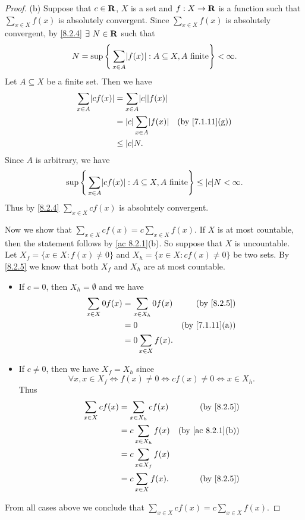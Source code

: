 \begin{proof}{(b)}
  Suppose that \(c \in \mathbf{R}\), \(X\) is a set and \(f : X \to \mathbf{R}\) is a function such that \(\sum_{x \in X} f(x)\) is absolutely convergent.
  Since \(\sum_{x \in X} f(x)\) is absolutely convergent, by \cref{8.2.4} \(\exists\ N \in \mathbf{R}\) such that
  \[
    N = \sup\Bigg\{\sum_{x \in A} \abs{f(x)} : A \subseteq X, A \text{ finite}\Bigg\} < \infty.
  \]
  Let \(A \subseteq X\) be a finite set.
  Then we have
  \begin{align*}
    \sum_{x \in A} \abs{cf(x)} & = \sum_{x \in A} \abs{c}\abs{f(x)}                                \\
                               & = \abs{c}\sum_{x \in A} \abs{f(x)} & \text{(by \cref{7.1.11}(g))} \\
                               & \leq \abs{c} N.
  \end{align*}
  Since \(A\) is arbitrary, we have
  \[
    \sup\Bigg\{\sum_{x \in A} \abs{cf(x)} : A \subseteq X, A \text{ finite}\Bigg\} \leq \abs{c}N < \infty.
  \]
  Thus by \cref{8.2.4} \(\sum_{x \in X} cf(x)\) is absolutely convergent.

  Now we show that \(\sum_{x \in X} cf(x) = c \sum_{x \in X} f(x)\).
  If \(X\) is at most countable, then the statement follows by \cref{ac 8.2.1}(b).
  So suppose that \(X\) is uncountable.
  Let \(X_f = \{x \in X : f(x) \neq 0\}\) and \(X_h = \{x \in X : cf(x) \neq 0\}\) be two sets.
  By \cref{8.2.5} we know that both \(X_f\) and \(X_h\) are at most countable.
  \begin{itemize}
    \item If \(c = 0\), then \(X_h = \emptyset\) and we have
          \begin{align*}
            \sum_{x \in X} 0f(x) & = \sum_{x \in X_h} 0f(x) & \text{(by \cref{8.2.5})}     \\
                                 & = 0                      & \text{(by \cref{7.1.11}(a))} \\
                                 & = 0 \sum_{x \in X} f(x).
          \end{align*}
    \item If \(c \neq 0\), then we have \(X_f = X_h\) since
          \[
            \forall x, x \in X_f \iff f(x) \neq 0 \iff cf(x) \neq 0 \iff x \in X_h.
          \]
          Thus
          \begin{align*}
            \sum_{x \in X} cf(x) & = \sum_{x \in X_h} cf(x)  & \text{(by \cref{8.2.5})}       \\
                                 & = c \sum_{x \in X_h} f(x) & \text{(by \cref{ac 8.2.1}(b))} \\
                                 & = c \sum_{x \in X_f} f(x)                                  \\
                                 & = c \sum_{x \in X} f(x).  & \text{(by \cref{8.2.5})}
          \end{align*}
  \end{itemize}
  From all cases above we conclude that \(\sum_{x \in X} cf(x) = c \sum_{x \in X} f(x)\).
\end{proof}

